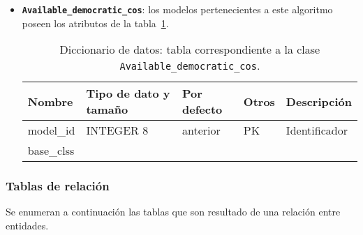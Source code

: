 \begin{itemize}
	\item \textbf{\texttt{Available\_democratic\_cos}}: los modelos pertenecientes a este algoritmo poseen los atributos de la tabla~\ref{datadic:democraticco}.

	\begin{table}
		\small
		\begin{centering}
			\begin{tabular}{@{}p{6em} p{6em} p{6em} p{6em} p{6em}@{}}
				\toprule
				\textbf{Nombre} & \textbf{Tipo de dato y tamaño} & \textbf{Por defecto}& \textbf{Otros} & \textbf{Descripción}\\
				\midrule
				model\_id & INTEGER 8 & anterior & PK & Identificador \\
				base\_clss &  &  &  &  \\
				\bottomrule
			\end{tabular}
		\end{centering}
		\caption[Diccionario de datos: Available\_democratic\_cos]{Diccionario de datos: tabla correspondiente a la clase \texttt{Available\_democratic\_cos}.}
		\label{datadic:democraticco}
	\end{table}
\end{itemize}

\subsubsection{Tablas de relación}

Se enumeran a continuación las tablas que son resultado de una relación entre entidades.

